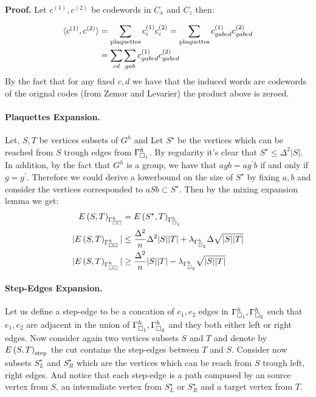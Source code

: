\documentclass{article}
\begin{document}
\begin{multicols*}{2}
\textbf{Proof.} Let $c^{\left( 1 \right)}, c^{\left( 2 \right)}$ be codewords in $C_{x}$ and $C_{z}$ then: 

\begin{equation*}
  \begin{split}
    \braket{c^{\left( 1 \right)}, c^{\left( 2 \right)}} &= \sum_{\text{plaquettes}}c^{\left( 1 \right)}_{i} c^{\left( 2 \right)}_{i}= \sum_{\text{plaquettes}}c^{\left( 1 \right)}_{gabcd} c^{\left( 2 \right)}_{gabcd} \\ 
    &= \sum_{cd}{\sum_{gab}{ c^{\left( 1 \right)}_{gabcd} c^{\left( 2 \right)}_{gabcd} }} 
  \end{split}
\end{equation*}
By the fact that for any fixed $c,d$ we have that the induced words are codewords of the orignal codes (from Zemor and Levarier) the product above is zeroed.  
	\paragraph{Plaquettes Expansion.} Let, $S , T$ be vertices subsets of $G^{h}$ and Let $S^{\star}$ be the vertices which can be reached from $S$ trough edges from $\Gamma_{\square_{1}}^{h}$. By regularity it's clear that $S^{\star}\le \Delta^{2}|S|$. In addition, by the fact that $G^{h}$ is a group, we have that $agb = ag^{\prime}b$ if and only if $g = g^{\prime}$. 
	Therefore we could derive a lowerbound on the size of $S^{\star}$ by fixing $a,b$ and consider the vertices corresponded to $aSb \subset S^{\star}$.    
	Then by the mixing expansion lemma we get: 
	\begin{equation*}
	  \begin{split}
	  E\left( S,T \right)_{\Gamma_{\square \square }^{h}} &= E\left( S^{\star}, T  \right)_{\Gamma_{\square_{1}}^{h}} \\
	|E\left( S,T \right)_{\Gamma_{\square \square }^{h}}| &\le \frac{\Delta^{2}}{n}\Delta^{2}|S||T| + \lambda_{\Gamma_{\square_{2}}^{h}}\Delta\sqrt{|S||T|} \\ 
      |E\left( S,T \right)_{\Gamma_{\square \square }^{h}}| &\ge \frac{\Delta^{2}}{n}|S||T| - \lambda_{\Gamma_{\square_{2}}^{h}}\sqrt{|S||T|}  
	  \end{split}
	\end{equation*}
	\paragraph{Step-Edges Expansion.} Let us define a step-edge to be a concation of $e_{1},e_{2}$ edges in $\Gamma_{\square_{1}}^{h}, \Gamma_{\square_{2}}^{h}$ such that $e_{1},e_{2}$ are adjacent in the union of $\Gamma_{\square_{1}}^{h}, \Gamma_{\square_{2}}^{h}$ and they both either left or right edges. 
	Now consider again two vertices subsets $S$ and $T$ and denote by $ E\left( S,T \right)_{\text{step}} $ the cut contains the step-edges between $T$ and $S$.
	Consider now subsets $S^{\star}_{L}$ and $S^{\star}_{R}$ which are the vertices which can be reach from $S$ trough left, right edges. And notice that each step-edge is a path compused by an source vertex from $S$, an intermdiate vertex from $S^{\star}_{L}$ or $S^{\star}_{R}$ and a target vertex from $T$. 


\end{multicols*}
\end{document}
